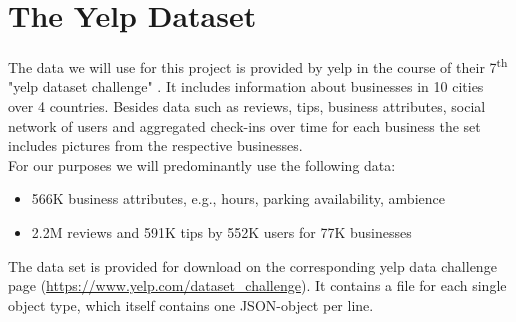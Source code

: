 \section{The Yelp Dataset} %
\label{cha:yelp}
The data we will use for this project is provided by yelp in the course of their 7\textsuperscript{th} "yelp dataset challenge" %
. It includes information about businesses in 10 cities over 4 countries. Besides data such as reviews, tips, business attributes, social network of users and aggregated check-ins over time for each business the set includes pictures from the respective businesses.\\ 
For our purposes we will predominantly use the following data: 
\begin{itemize}
	\item566K business attributes, e.g., hours, parking availability, ambience
	\item2.2M reviews and 591K tips by 552K users for 77K businesses
\end{itemize}
The data set is provided for download on the corresponding yelp data challenge page (\url{https://www.yelp.com/dataset_challenge}). It contains a file for each single object type, which itself contains one JSON-object per line. %

